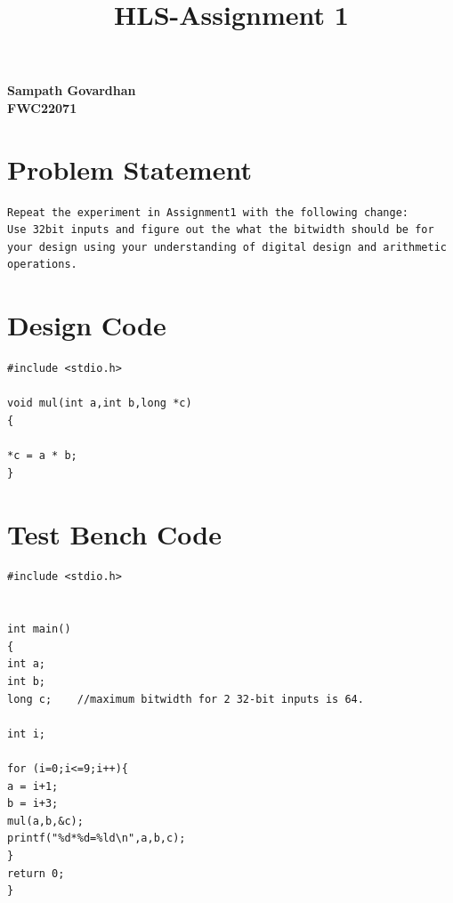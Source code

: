 \documentclass{article}
\title{
HLS-Assignment 1
}
\begin{document}
\maketitle
\hfill \textbf{Sampath Govardhan} \\
\null \hfill \textbf{FWC22071}\\
\tableofcontents
\section{Problem Statement}
\begin{lstlisting}
Repeat the experiment in Assignment1 with the following change:
Use 32bit inputs and figure out the what the bitwidth should be for your design using your understanding of digital design and arithmetic operations.
\end{lstlisting}
\vspace{10cm}


\section{Design Code}
\begin{lstlisting}
#include <stdio.h>

void mul(int a,int b,long *c)
{

*c = a * b;
}

\end{lstlisting}
\vspace{5cm}


\section{Test Bench Code}
\begin{lstlisting}
#include <stdio.h>


int main()
{
int a;
int b;
long c;    //maximum bitwidth for 2 32-bit inputs is 64.

int i;

for (i=0;i<=9;i++){
a = i+1;
b = i+3;
mul(a,b,&c);
printf("%d*%d=%ld\n",a,b,c);
}
return 0;
}


\end{lstlisting}
\vspace{5cm}
\end{document}
